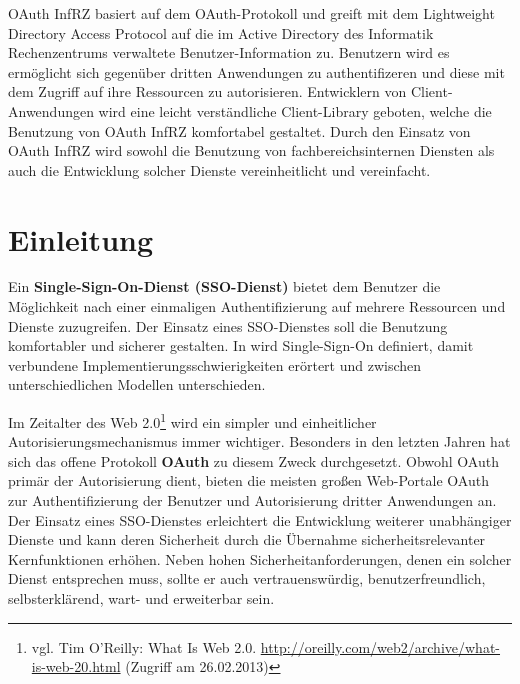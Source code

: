 \documentclass[12pt,a4paper,pointednumbers,abstracton]{scrartcl}
\begin{document}
OAuth InfRZ basiert auf dem OAuth-Protokoll und greift mit dem Lightweight Directory Access Protocol auf die im Active Directory des Informatik Rechenzentrums verwaltete Benutzer-Information zu.
Benutzern wird es ermöglicht sich gegenüber dritten Anwendungen zu authentifizeren und diese mit dem Zugriff auf ihre Ressourcen zu autorisieren.
Entwicklern von Client-Anwendungen wird eine leicht verständliche Client-Library geboten, welche die Benutzung von OAuth InfRZ komfortabel gestaltet.
Durch den Einsatz von OAuth InfRZ wird sowohl die Benutzung von fachbereichsinternen Diensten als auch die Entwicklung solcher Dienste vereinheitlicht und vereinfacht.

\newpage
\tableofcontents

\newpage
{}
\setcounter{page}{1}
\section{Einleitung}
\label{sec:einleitung}

Ein \textbf{Single-Sign-On-Dienst (SSO-Dienst)} bietet dem Benutzer die Möglichkeit nach einer einmaligen Authentifizierung auf mehrere Ressourcen und Dienste zuzugreifen.
Der Einsatz eines SSO-Dienstes soll die Benutzung komfortabler und sicherer gestalten.
In \cite{Hur97} wird Single-Sign-On definiert, damit verbundene Implementierungsschwierigkeiten erörtert und zwischen unterschiedlichen Modellen unterschieden.

Im Zeitalter des Web 2.0\footnote{vgl. Tim O'Reilly: What Is Web 2.0. \url{http://oreilly.com/web2/archive/what-is-web-20.html} (Zugriff am 26.02.2013)} wird ein simpler und einheitlicher Autorisierungsmechanismus immer wichtiger.
Besonders in den letzten Jahren hat sich das offene Protokoll \textbf{OAuth} zu diesem Zweck durchgesetzt.
Obwohl OAuth primär der Autorisierung dient, bieten die meisten großen Web-Portale OAuth zur Authentifizierung der Benutzer und Autorisierung dritter Anwendungen an.
Der Einsatz eines SSO-Dienstes erleichtert die Entwicklung weiterer unabhängiger Dienste und kann deren Sicherheit durch die Übernahme sicherheitsrelevanter Kernfunktionen erhöhen.
Neben hohen Sicherheitanforderungen, denen ein solcher Dienst entsprechen muss, sollte er auch vertrauenswürdig, benutzerfreundlich, selbsterklärend, wart- und erweiterbar sein.
\end{document}
